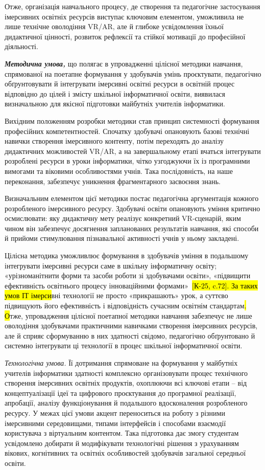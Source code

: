 Отже, організація навчального процесу, де створення та педагогічне застосування імерсивних освітніх ресурсів виступає ключовим елементом, уможливила не лише технічне оволодіння VR/AR, але й глибоке усвідомлення їхньої дидактичної цінності, розвиток рефлексії та стійкої мотивації до професійної діяльності.

\emph{\textbf{Методична умова,}} що полягає в упровадженні цілісної методики навчання, спрямованої на поетапне формування у здобувачів умінь проєктувати, педагогічно обґрунтовувати й інтегрувати імерсивні освітні ресурси в освітній процес відповідно до цілей і змісту шкільної інформатичної освіти, виявилася визначальною для якісної підготовки майбутніх учителів інформатики.

Вихідним положенням розробки методики став принцип системності формування професійних компетентностей. Спочатку здобувачі опановують базові технічні навички створення імерсивного контенту, потім переходять до аналізу дидактичних можливостей VR/AR, а на завершальному етапі вчаться інтегрувати розроблені ресурси в уроки інформатики, чітко узгоджуючи їх із програмними вимогами та віковими особливостями учнів. Така послідовність, на наше переконання, забезпечує уникнення фрагментарного засвоєння знань.

Визначальним елементом цієї методики постає педагогічна аргументація кожного розробленого імерсивного ресурсу. Здобувачі освіти опановують уміння критично осмислювати: яку дидактичну мету реалізує конкретний VR-сценарій, яким чином він забезпечує досягнення запланованих результатів навчання, які способи й прийоми стимулювання пізнавальної активності учнів у ньому закладені.

Цілісна методика уможливлює формування в здобувачів уміння в подальшому інтегрувати імерсивні ресурси саме в шкільну інформатичну освіту; «урізноманітнити форми та засоби роботи зі здобувачами освіти», «підвищити ефективність освітнього процесу інноваційними формами»~\hl{{[}К-25, c.72{]}. За таких умов ІТ імерси}вні технології не просто «прикрашають» урок, а суттєво підвищують його ефективність і відповідність сучасним освітнім стандартам\hl{. О}тже, упровадження цілісної поетапної методики навчання забезпечує не лише оволодіння здобувачами практичними навичками створення імерсивних ресурсів, але й сприяє сформуванню в них здатності свідомо, педагогічно обґрунтовано й системно інтегрувати ці технології в процес шкільної інформатичної освіти.

\emph{Технологічна умова.} Її дотримання спрямоване на формування у майбутніх учителів інформатики здатності комплексно організовувати процес технічного створення імерсивних освітніх продуктів, охоплюючи всі ключові етапи -- від концептуалізації ідеї та цифрового проєктування до програмної реалізації, апробації, аналізу функціонування й подальшого вдосконалення розробленого ресурсу. У межах цієї умови акцент переноситься на роботу з різними імерсивними середовищами, типами інтерфейсів і способами взаємодії користувача з віртуальним контентом. Така підготовка дає змогу студентам усвідомлено добирати й модифікувати технологічні рішення з урахуванням вікових, когнітивних та освітніх особливостей здобувачів загальної середньої освіти.

